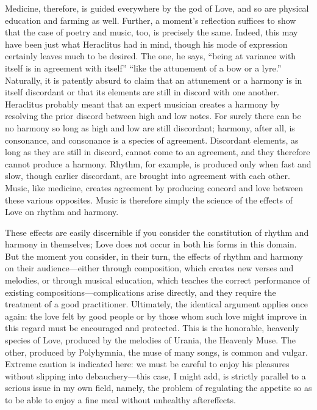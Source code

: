  Medicine, therefore, is guided everywhere by the god of
Love, and so are physical education and farming as well. Further, a
moment’s reflection suffices to show that the case of poetry and music,
too, is precisely the same. Indeed, this may have been just what
Heraclitus had in mind, though his mode of expression certainly leaves
much to be desired. The one, he says, “being at variance with itself is
in agreement with itself” “like the attunement of a bow or a
lyre.” Naturally, it
is patently absurd to claim that an attunement or a harmony is in itself
discordant or that its elements are still in discord with one another.
Heraclitus probably meant that an expert musician creates a harmony by
resolving the prior discord between  high and low notes. For
surely there can be no harmony so long as high and low are still
discordant; harmony, after all, is consonance, and consonance is a
species of agreement. Discordant elements, as long as they are still in
discord, cannot come to an agreement, and they therefore cannot produce
a harmony. Rhythm, for example, is produced only when fast and slow,
 though earlier discordant, are brought into agreement with each
other. Music, like medicine, creates agreement by producing concord and
love between these various opposites. Music is therefore simply the
science of the effects of Love on rhythm and harmony.

These effects are easily discernible if you consider the constitution of
rhythm and harmony in themselves; Love does not occur in both his forms
in this domain. But the moment you consider, in their turn, the effects
of rhythm and harmony on their audience---either through composition,
 which creates new verses and melodies, or through musical
education, which teaches the correct performance of existing
compositions---complications arise directly, and they require the
treatment of a good practitioner. Ultimately, the identical argument
applies once again: the love felt by good people or by those whom such
love might improve in this regard must be encouraged and protected. This
is the honorable, heavenly species of Love, produced by the melodies of
Urania, the Heavenly Muse.  The other, produced by Polyhymnia,
the muse of many songs, is common and vulgar. Extreme caution is
indicated here: we must be careful to enjoy his pleasures without
slipping into debauchery---this case, I might add, is strictly parallel
to a serious issue in my own field, namely, the problem of regulating
the appetite so as to be able to enjoy a fine meal without unhealthy
aftereffects.

